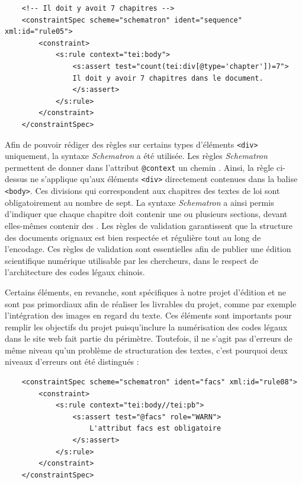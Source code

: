 \begin{verbatim}
    <!-- Il doit y avoit 7 chapitres -->
    <constraintSpec scheme="schematron" ident="sequence" xml:id="rule05">
        <constraint>
            <s:rule context="tei:body">
                <s:assert test="count(tei:div[@type='chapter'])=7"> 
                Il doit y avoir 7 chapitres dans le document. 
                </s:assert>
            </s:rule>
        </constraint>
    </constraintSpec>
\end{verbatim}

Afin de pouvoir rédiger des règles sur certains types d'éléments \texttt{<div>} uniquement, la syntaxe \textit{Schematron} a été utilisée. Les règles \textit{Schematron} permettent de donner dans l'attribut \texttt{@context} un chemin \xpath. Ainsi, la règle ci-dessus ne s'applique qu'aux éléments \texttt{<div>} directement contenues dans la balise \texttt{<body>}. Ces divisions qui correspondent aux chapitres des textes de loi sont obligatoirement au nombre de sept. La syntaxe \textit{Schematron} a ainsi permis d'indiquer que chaque chapitre doit contenir une ou plusieurs sections, devant elles-mêmes contenir des \lu. Les règles de validation garantissent que la structure des documents orignaux est bien respectée et régulière tout au long de l'encodage. Ces règles de validation sont essentielles afin de publier une édition scientifique numérique utilisable par les chercheurs, dans le respect de l'architecture des codes légaux chinois. 

Certains éléments, en revanche, sont spécifiques à notre projet d'édition et ne sont pas primordiaux afin de réaliser les livrables du projet, comme par exemple l'intégration des images en regard du texte. Ces éléments sont importants pour remplir les objectifs du projet puisqu'inclure la numérisation des codes légaux dans le site web fait partie du périmètre. Toutefois, il ne s'agit pas d'erreurs de même niveau qu'un problème de structuration des textes, c'est pourquoi deux niveaux d'erreurs ont été distingués : 

\begin{verbatim}
    <constraintSpec scheme="schematron" ident="facs" xml:id="rule08">
        <constraint>
            <s:rule context="tei:body//tei:pb">
                <s:assert test="@facs" role="WARN"> 
                    L'attribut facs est obligatoire 
                </s:assert>
            </s:rule>
        </constraint>
    </constraintSpec>
\end{verbatim}

